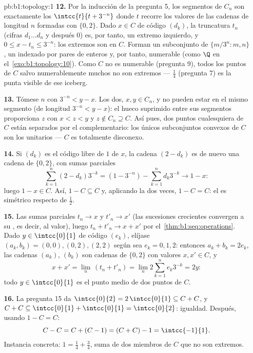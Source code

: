 \begin{solution}{pb:b1:topology:1}
\textbf{12.} Por la inducción de la pregunta 5, los segmentos de
$C_n$ son exactamente los $\intcc{t}{t + 3^{-n}}$ donde $t$ recorre
los valores de las cadenas de longitud $n$ formadas con $\{0,2\}$. Dado
$x \in C$ de código $(d_k)$, la truncatura $t_n$ (cifras
$d_1 \dots d_n$ y después $0$) es, por tanto, un extremo izquierdo,
y $0 \leq x - t_n \leq 3^{-n}$: los extremos son  en $C$.
Forman un subconjunto de $\{m/3^n : m, n\}$, un  indexado
por pares de enteros y, por tanto, numerable (como $\Q$ en
el~\cref{exo:b1:topology:10}). Como $C$ no es numerable (pregunta 9),
todos los puntos de $C$ salvo numerablemente muchos no son extremos
--- $\frac14$ (pregunta 7) es la punta visible de ese iceberg.

\textbf{13.} Tómese $n$ con $3^{-n} < y - x$. Los dos, $x, y \in
C_n$, y no pueden estar en el mismo segmento (de longitud
$3^{-n} < y - x$): el hueco suprimido entre sus segmentos
proporciona $z$ con $x < z < y$ y $z \notin C_n \supseteq C$. Así
pues, dos puntos cualesquiera de $C$ están separados por el
complementario: los únicos subconjuntos convexos de $C$ son los
unitarios --- $C$ es totalmente disconexo.

\textbf{14.} Si $(d_k)$ es el código libre de $1$ de $x$, la cadena
$(2 - d_k)$ es de nuevo una cadena de $\{0,2\}$, con sumas parciales
\[
\sum_{k=1}^{n} (2 - d_k)3^{-k} = (1 - 3^{-n}) - \sum_{k=1}^n
d_k 3^{-k} \longrightarrow 1 - x :
\]
luego $1 - x \in C$. Así, $1 - C \subseteq C$ y, aplicando la
 dos veces, $1 - C = C$: el  es simétrico
respecto de $\frac12$.

\textbf{15.} Las sumas parciales $t_n \to x$ y $t'_n \to x'$ (las
sucesiones crecientes convergen a su , es decir, al valor),
luego $t_n + t'_n \to x + x'$ por
el~\cref{thm:b1:seq:operations}. Dado $y \in \intcc{0}{1}$ de código
$(e_k)$, elíjase $(a_k, b_k) = (0,0), (0,2), (2,2)$ según sea
$e_k = 0, 1, 2$: entonces $a_k + b_k = 2e_k$, las cadenas $(a_k)$,
$(b_k)$ son cadenas de $\{0,2\}$ con valores $x, x' \in C$, y
\[
x + x' = \lim_n\,(t_n + t'_n) = \lim_n 2\sum_{k=1}^n e_k 3^{-k}
= 2y :
\]
todo $y \in \intcc{0}{1}$ es el punto medio de dos puntos de $C$.

\textbf{16.} La pregunta 15 da $\intcc{0}{2} = 2\,\intcc{0}{1}
\subseteq C + C$, y $C + C \subseteq \intcc{0}{1} + \intcc{0}{1} =
\intcc{0}{2}$: igualdad. Después, usando $1 - C = C$:
\[
C - C = C + (C - 1) = (C + C) - 1 = \intcc{-1}{1} .
\]
Instancia concreta: $1 = \frac14 + \frac34$, suma de dos miembros
de $C$ que no son extremos.


\end{solution}
